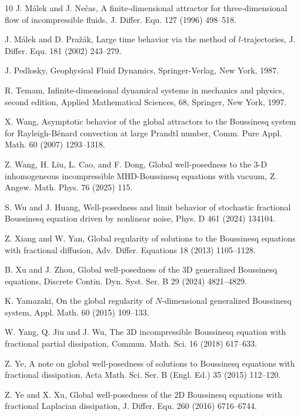 \documentclass[oneside,preprint,12pt,numbers,sort&compress]{elsarticle}
\begin{document}
\begin{thebibliography}{10}
J. M\'alek and J. Ne\v cas, A finite-dimensional attractor for three-dimensional flow of incompressible fluids, J. Differ. Equ. 127 (1996) 498--518. %

J. M\'alek and D. Pra\v z\'ak, Large time behavior via the method of $l$-trajectories, J. Differ. Equ. 181 (2002) 243--279.%

J. Pedlosky, Geophysical Fluid Dynamics, Springer-Verlag, New York, 1987.

R. Temam, Infinite-dimensional dynamical systems in mechanics and physics, second edition, 
Applied Mathematical Sciences, 68, Springer, New York, 1997. %

X. Wang, Asymptotic behavior of the global attractors to the Boussinesq system for Rayleigh-B\'enard convection at large Prandtl number, Comm. Pure Appl. Math. 60 (2007) 1293--1318.%

Z. Wang, H. Liu, L. Cao, and F. Dong, Global well-posedness to the 3-D inhomogeneous incompressible MHD-Boussinesq equations with vacuum, Z. Angew. Math. Phys. 76 (2025) 115.%

S. Wu and J. Huang, Well-posedness and limit behavior of stochastic fractional Boussinesq equation driven by nonlinear noise, Phys. D 461 (2024) 134104.%

Z. Xiang and W. Yan, Global regularity of solutions to the Boussinesq equations with fractional diffusion, Adv. Differ. Equations 18 (2013) 1105--1128.%

B. Xu and J. Zhou, Global well-posedness of the 3D generalized Boussinesq equations, Discrete Contin. Dyn. Syst. Ser. B 29 (2024) 4821--4829.%

K. Yamazaki, On the global regularity of $N$-dimensional generalized Boussinesq system, Appl. Math. 60 (2015) 109--133.%

W. Yang, Q. Jiu and J. Wu, The 3D incompressible Boussinesq equation with fractional partial dissipation, Commun. Math. Sci. 16 (2018) 617--633.%

Z. Ye, A note on global well-posedness of solutions to Boussinesq equations with fractional dissipation, Acta Math. Sci. Ser. B (Engl. Ed.) 35 (2015) 112--120. %

Z. Ye and X. Xu, Global well-posedness of the 2D Boussinesq equations with fractional Laplacian dissipation, J. Differ. Equ. 260 (2016) 6716--6744.%


\end{thebibliography}
\end{document}
